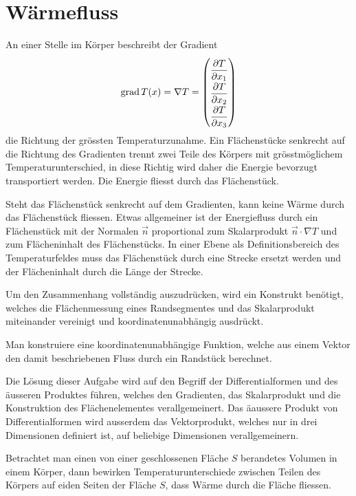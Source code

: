 %
%
%

%
%
\section{Wärmefluss
\label{buch:fallstudie:waermefluss}}
An einer Stelle im Körper beschreibt der Gradient
\[
\operatorname{grad} T(x)
=
\nabla T
=
\renewcommand{\arraystretch}{1.9}
\begin{pmatrix}
\displaystyle \frac{\partial T}{\partial x_1}\\
\displaystyle \frac{\partial T}{\partial x_2}\\
\displaystyle \frac{\partial T}{\partial x_3}
\end{pmatrix}
\]
die Richtung der grössten Temperaturzunahme.
Ein Flächenstücke senkrecht auf die Richtung des Gradienten
trennt zwei Teile des Körpers mit grösstmöglichem Temperaturunterschied,
in diese Richtig wird daher die Energie bevorzugt transportiert werden.
Die Energie fliesst durch das Flächenstück.

Steht das Flächenstück senkrecht auf dem Gradienten, kann keine
Wärme durch das Flächenstück fliessen.
Etwas allgemeiner ist der Energiefluss durch ein Flächenstück mit der
Normalen $\vec{n}$ proportional zum Skalarprodukt $\vec{n}\cdot\nabla T$
und zum Flächeninhalt des Flächenstücks.
In einer Ebene als Definitionsbereich des Temperaturfeldes muss
das Flächenstück durch eine Strecke ersetzt werden und der Flächeninhalt
durch die Länge der Strecke.

Um den Zusammenhang vollständig auszudrücken, wird ein Konstrukt 
benötigt, welches die Flächenmessung eines Randsegmentes und das
Skalarprodukt miteinander vereinigt und koordinatenunabhängig
ausdrückt.

\begin{aufgabe}
Man konstruiere eine koordinatenunabhängige Funktion, welche aus einem
Vektor den damit beschriebenen Fluss durch ein Randstück berechnet.
\end{aufgabe}

Die Lösung dieser Aufgabe wird auf den Begriff der Differentialformen
und des äusseren Produktes führen, welches den Gradienten, das Skalarprodukt
und die Konstruktion des Flächenelementes verallgemeinert.
Das äaussere Produkt von Differentialformen wird ausserdem das
Vektorprodukt, welches nur in drei Dimensionen definiert ist, auf beliebige
Dimensionen verallgemeinern.

Betrachtet man einen von einer geschlossenen Fläche $S$ berandetes
Volumen in einem Körper, dann bewirken Temperaturunterschiede zwischen
Teilen des Körpers auf eiden Seiten der Fläche $S$, dass Wärme durch
die Fläche fliessen.

